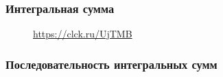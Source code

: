 \documentclass{article}
\begin{document}
\subsubsection{Интегральная сумма}
\begin{figure}[h!]
\caption*{\url{https://clck.ru/UjTMB}}
\end{figure}
\subsubsection{Последовательность интегральных сумм}
\end{document}

